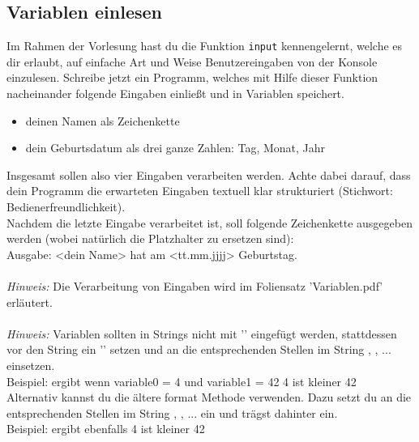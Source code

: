 \subsection{Variablen einlesen}
Im Rahmen der Vorlesung hast du die Funktion \texttt{input} kennengelernt, welche es dir erlaubt, auf einfache Art und Weise Benutzereingaben von der Konsole einzulesen. Schreibe jetzt ein Programm, welches mit Hilfe dieser Funktion nacheinander folgende Eingaben einließt und in Variablen speichert.
\begin{itemize}
    \item deinen Namen als Zeichenkette
    \item dein Geburtsdatum als drei ganze Zahlen: Tag, Monat, Jahr
\end{itemize}
Insgesamt sollen also vier Eingaben verarbeiten werden. Achte dabei darauf, dass dein Programm die erwarteten Eingaben textuell klar strukturiert (Stichwort: Bedienerfreundlichkeit).\\
Nachdem die letzte Eingabe verarbeitet ist, soll folgende Zeichenkette ausgegeben werden (wobei natürlich die Platzhalter zu ersetzen sind):\\
Ausgabe: {\ttfamily{\dq}}<dein Name> hat am <tt.mm.jjjj> Geburtstag.{\ttfamily{\dq}}\\
\\
\textit{Hinweis:} Die Verarbeitung von Eingaben wird im Foliensatz 'Variablen.pdf' erläutert.\\
\\
\textit{Hinweis:} Variablen sollten in Strings nicht mit '\pythoninline{+}' eingefügt werden, stattdessen vor den String ein '' setzen und an die entsprechenden Stellen im String , , ... einsetzen. \\
Beispiel:  ergibt wenn variable0 = 4 und variable1 = 42 {\ttfamily{\dq}}4 ist kleiner 42{\ttfamily{\dq}}\\
Alternativ kannst du die ältere format Methode verwenden. Dazu setzt du an die entsprechenden Stellen im String , , ... ein und trägst dahinter  ein.\\
Beispiel:  ergibt ebenfalls {\ttfamily{\dq}}4 ist kleiner 42{\ttfamily{\dq}}
